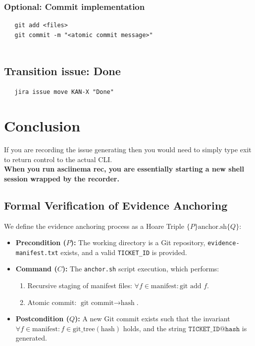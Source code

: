\documentclass{article}
\begin{document}
\subsubsection*{Optional: Commit implementation}  
 

\begin{verbatim}
   git add <files>
   git commit -m "<atomic commit message>"


\end{verbatim}


\subsection{Transition issue: Done}

\begin{verbatim}
   jira issue move KAN-X "Done"

\end{verbatim}

 

\section{Conclusion}

If you are recording the issue generating then you would need to simply
type exit to return control to the actual CLI.\\
\textbf{
  When you run asciinema rec, you are essentially starting a new shell session wrapped by the recorder.
}

 

\subsection{Formal Verification of Evidence Anchoring}
We define the evidence anchoring process as a Hoare Triple $\{P\} \text{anchor.sh} \{Q\}$:
\begin{itemize}
    \item \textbf{Precondition ($P$):} The working directory is a Git repository, \texttt{evidence-manifest.txt} exists, and a valid \texttt{TICKET\_ID} is provided.
    \item \textbf{Command ($C$):} The \texttt{anchor.sh} script execution, which performs:
    \begin{enumerate}
        \item Recursive staging of manifest files: $\forall f \in \text{manifest} : \text{git add } f$.
        \item Atomic commit: $\text{git commit} \rightarrow \text{hash}$.
    \end{enumerate}
    \item \textbf{Postcondition ($Q$):} A new Git commit exists such that the invariant $\forall f \in \text{manifest} : f \in \text{git\_tree}(\text{hash})$ holds, and the string $\texttt{TICKET\_ID@hash}$ is generated.
\end{itemize}
\end{document}
